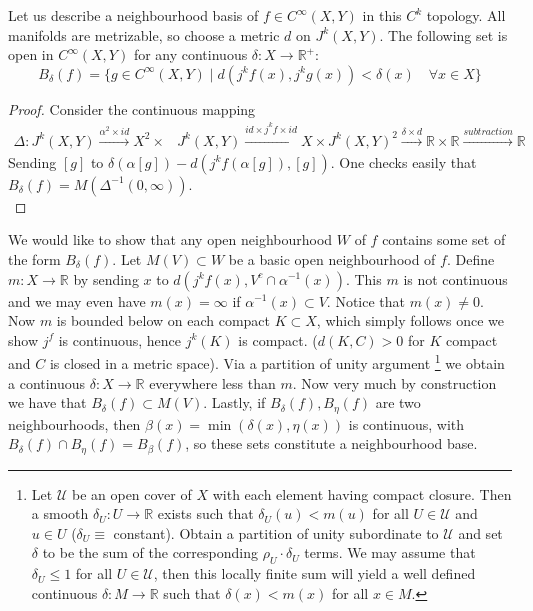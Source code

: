 \documentclass[12pt]{article}
\newcommand{\RR}{\mathbb{R}}
\begin{document}
Let us describe a neighbourhood basis of $f\in C^\infty(X, Y)$ in this $C^k$ topology. All manifolds are metrizable, so choose a metric $d$ on $J^k(X, Y)$. The following set is open in $C^\infty(X, Y)$ for any continuous $\delta: X \to \RR^+$:
$$
B_\delta(f) = \{ g\in C^\infty(X, Y) \mid d(j^k f (x), j^k g (x)) < \delta(x) \quad \forall x\in X\}
$$
\begin{proof}
    Consider the continuous mapping 
    \begin{align*}
        \Delta: J^k(X, Y) \xrightarrow{\alpha^2 \times id} X^2\times & J^k(X, Y) \xrightarrow{id\times j^k f \times id}  X\times J^k(X, Y)^2 \xrightarrow{\delta \times d} \RR \times \RR \xrightarrow{subtraction} \RR 
    \end{align*} 
    Sending $[g]$ to $\delta(\alpha [g]) - d(j^k f (\alpha [g]), [g])$. One checks easily that $B_\delta(f) = M(\Delta^{-1} (0, \infty))$. \\ 
\end{proof}
We would like to show that any open neighbourhood $W$ of $f$ contains some set of the form $B_\delta(f)$. Let $M(V) \subset W$ be a basic open neighbourhood of $f$. Define $m: X \to \RR$ by sending $x$ to $d(j^k f(x), V^c \cap \alpha^{-1}(x))$. This $m$ is not continuous and we may even have $m(x) = \infty$ if $\alpha^{-1}(x) \subset V$. Notice that $m(x) \neq 0$. Now $m$ is bounded below on each compact $K \subset X$, which simply follows once we show $j^f$ is continuous, hence $j^k(K)$ is compact. ($d(K, C) > 0$ for $K$ compact and $C$ is closed in a metric space). Via a partition of unity argument 
\footnote{Let $\mathcal{U}$ be an open cover of $X$ with each element having compact closure. Then a smooth $\delta_{U}: U \to \RR$ exists such that $\delta_U (u) < m(u)$ for all $U\in \mathcal{U}$ and $u\in U$ ($\delta_U \equiv$ constant). Obtain a partition of unity subordinate to $\mathcal{U}$ and set $\delta$ to be the sum of the corresponding $\rho_U \cdot \delta_U$ terms. We may assume that $\delta_U \leq 1$ for all $U\in \mathcal{U}$, then this locally finite sum will yield a well defined continuous $\delta: M \to \RR$ such that $\delta(x) < m(x)$ for all $x\in M$.}
we obtain a continuous $\delta: X \to \RR$ everywhere less than $m$. Now very much by construction we have that $B_\delta (f) \subset M(V)$. Lastly, if $B_\delta(f), B_\eta(f)$ are two neighbourhoods, then $\beta(x) = \min(\delta(x), \eta(x))$ is continuous, with $B_\delta(f) \cap B_\eta(f) = B_\beta(f)$, so these sets constitute a neighbourhood base. \\
\end{document}
